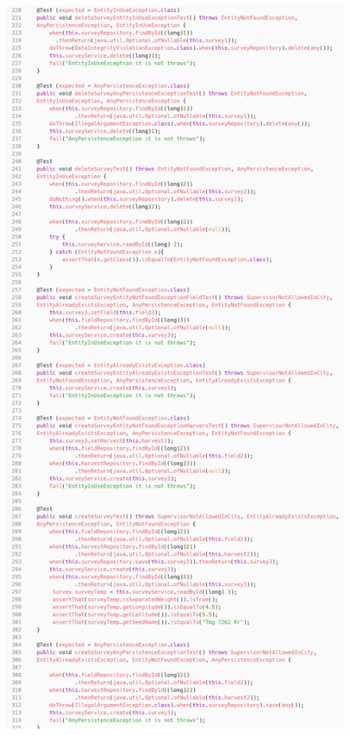 \begin{figure}[H]
	\centering
	\includegraphics[scale=0.26]{dados/figuras/carbonSurveyService2.png}
\end{figure}

